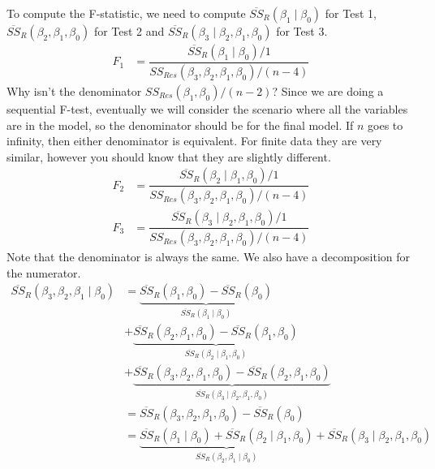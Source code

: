 \documentclass[12 pt]{article}
\begin{document}
To compute the F-statistic, we need to compute
$\overline{SS}_R(\beta_1 \mid \beta_0)$ for Test 1,
$\overline{SS}_R(\beta_2, \beta_1, \beta_0)$ for Test 2 and
$\overline{SS}_R(\beta_3 \mid \beta_2, \beta_1, \beta_0)$ for Test 3.
\begin{align*}
  F_1 & = \dfrac{\overline{SS}_R(\beta_1 \mid \beta_0)/1}{SS_{Res}(\beta_3, \beta_2, \beta_1, \beta_0)/(n-4)}
\end{align*}
Why isn't the denominator $SS_{Res}(\beta_1, \beta_0)/(n-2)$? Since we
are doing a sequential F-test, eventually we will consider the
scenario where all the variables are in the model, so the denominator
should be for the final model. If $n$ goes to infinity, then either
denominator is equivalent. For finite data they are very similar,
however you should know that they are slightly different.
\begin{align*}
  F_2 & =\dfrac{\overline{SS}_R(\beta_2 \mid \beta_1, \beta_0)/1}{SS_{Res}(\beta_3, \beta_2, \beta_1, \beta_0)/(n-4)}
  \\F_3 & =\dfrac{\overline{SS}_R(\beta_3 \mid \beta_2, \beta_1, \beta_0)/1}{SS_{Res}(\beta_3, \beta_2, \beta_1, \beta_0)/(n-4)}
\end{align*}
Note that the denominator is always the same. We also have a
decomposition for the numerator.
\begin{align*}
  \overline{SS}_R(\beta_3, \beta_2, \beta_1 \mid \beta_0) & = \underbrace{\overline{SS}_R (\beta_1, \beta_0) - \overline{SS}_{R}(\beta_0)}_{\overline{SS}_R (\beta_1 \mid \beta_0)}
  \\ &+ \underbrace{\overline{SS}_R (\beta_2, \beta_1, \beta_0) - \overline{SS}_R (\beta_1, \beta_0)}_{\overline{SS}_R (\beta_2 \mid \beta_1, \beta_0)}
  \\ &+ \underbrace{\overline{SS}_R (\beta_3, \beta_2, \beta_1, \beta_0) - \overline{SS}_R (\beta_2, \beta_1, \beta_0)}_{\overline{SS}_R(\beta_3 \mid \beta_2, \beta_1, \beta_0)}
  \\ & = \overline{SS}_R(\beta_3, \beta_2, \beta_1, \beta_0) - \overline{SS}_R (\beta_0)
  \\ & = \underbrace{\overline{SS}_R(\beta_1 \mid \beta_0) + \overline{SS}_R (\beta_2 \mid \beta_1, \beta_0)}_{\overline{SS}_R(\beta_2, \beta_1 \mid \beta_0)} + \overline{SS}_R (\beta_3 \mid \beta_2, \beta_1, \beta_0)
\end{align*}
\end{document}
